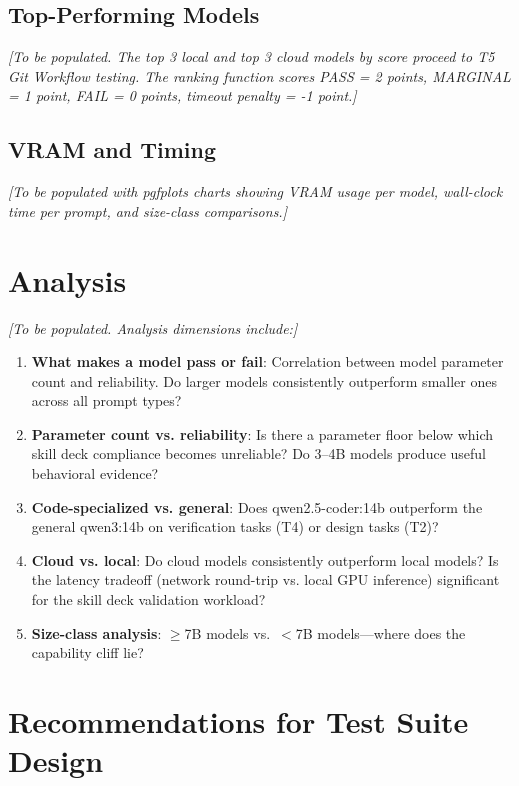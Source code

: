 \documentclass[11pt,a4paper]{article}
\begin{document}
\subsection{Top-Performing Models}

\textit{[To be populated. The top 3 local and top 3 cloud models by score proceed to T5 Git Workflow testing. The ranking function scores PASS = 2 points, MARGINAL = 1 point, FAIL = 0 points, timeout penalty = -1 point.]}

\subsection{VRAM and Timing}

\textit{[To be populated with pgfplots charts showing VRAM usage per model, wall-clock time per prompt, and size-class comparisons.]}

\section{Analysis}

\textit{[To be populated. Analysis dimensions include:]}

\begin{enumerate}
    \item \textbf{What makes a model pass or fail}: Correlation between model parameter count and reliability. Do larger models consistently outperform smaller ones across all prompt types?
    \item \textbf{Parameter count vs. reliability}: Is there a parameter floor below which skill deck compliance becomes unreliable? Do 3--4B models produce useful behavioral evidence?
    \item \textbf{Code-specialized vs. general}: Does qwen2.5-coder:14b outperform the general qwen3:14b on verification tasks (T4) or design tasks (T2)?
    \item \textbf{Cloud vs. local}: Do cloud models consistently outperform local models? Is the latency tradeoff (network round-trip vs. local GPU inference) significant for the skill deck validation workload?
    \item \textbf{Size-class analysis}: $\geq$7B models vs.\ $<$7B models—where does the capability cliff lie?
\end{enumerate}

\section{Recommendations for Test Suite Design}
\end{document}
